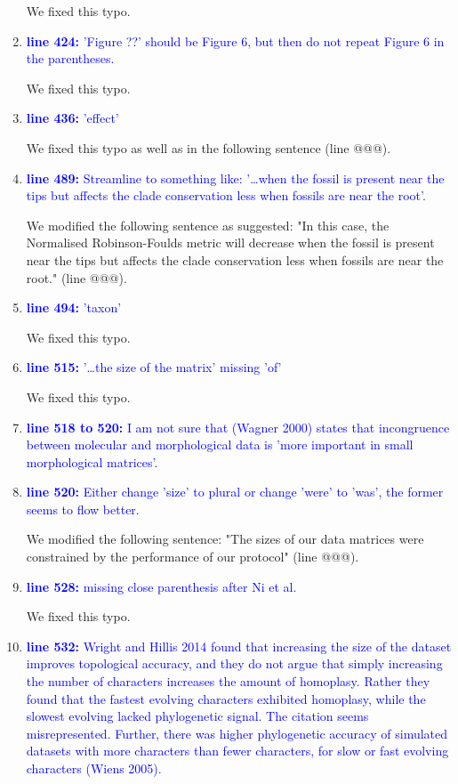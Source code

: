 \documentclass[12pt,letterpaper]{article}
\begin{document}
\begin{enumerate}
We fixed this typo.

\item{\textcolor{blue}{\textbf{line 424:} 'Figure ??' should be Figure 6, but then do not repeat Figure 6 in the parentheses. }}

We fixed this typo.

\item{\textcolor{blue}{\textbf{line 436:} 'effect'}}

We fixed this typo as well as in the following sentence (line @@@).

\item{\textcolor{blue}{\textbf{line 489:} Streamline to something like: '…when the fossil is present near the tips but affects the clade conservation less when fossils are near the root'. }}

We modified the following sentence as suggested: "In this case, the Normalised Robinson-Foulds metric will decrease when the fossil is present near the tips but affects the clade conservation less when fossils are near the root." (line @@@).

\item{\textcolor{blue}{\textbf{line 494:} 'taxon'}}

We fixed this typo.

\item{\textcolor{blue}{\textbf{line 515:} '…the size of the matrix' missing 'of'}}

We fixed this typo.

\item{\textcolor{blue}{\textbf{line 518 to 520:} I am not sure that (Wagner 2000) states that incongruence between molecular and morphological data is 'more important in small morphological matrices'. }}


\item{\textcolor{blue}{\textbf{line 520:} Either change 'size' to plural or change 'were' to 'was', the former seems to flow better. }}

We modified the following sentence: "The sizes of our data matrices were constrained by the performance of our protocol" (line @@@).

\item{\textcolor{blue}{\textbf{line 528:} missing close parenthesis after Ni et al.}}

We fixed this typo.

\item{\textcolor{blue}{\textbf{line 532:} Wright and Hillis 2014 found that increasing the size of the dataset improves topological accuracy, and they do not argue that simply increasing the number of characters increases the amount of homoplasy. Rather they found that the fastest evolving characters exhibited homoplasy, while the slowest evolving lacked phylogenetic signal. The citation seems misrepresented. Further, there was higher phylogenetic accuracy of simulated datasets with more characters than fewer characters, for slow or fast evolving characters (Wiens 2005).}}


\end{enumerate}
\end{document}
